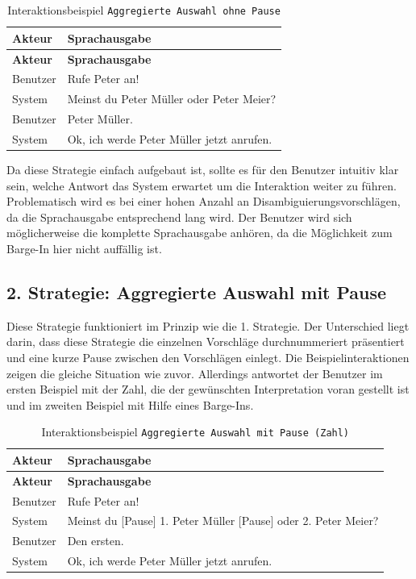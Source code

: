 \documentclass[12pt,a4paper]{scrartcl}
\begin{document}
\begin{longtable}{p{6cm}p{8cm}}
	\caption[Interaktionsbeispiel \texttt{Aggregierte Auswahl ohne Pause}]{Interaktionsbeispiel \texttt{Aggregierte Auswahl ohne Pause}}\\
	\hline
	\textbf{Akteur} &	\textbf{Sprachausgabe}\\
	\hline
	\endfirsthead
	\hline
	\textbf{Akteur} &	\textbf{Sprachausgabe}\\
	\hline
	\endhead
Benutzer & Rufe Peter an!\\
System & Meinst du Peter Müller oder Peter Meier?\\
Benutzer & Peter Müller.\\
System & Ok, ich werde Peter Müller jetzt anrufen.\\

\hline
\end{longtable}
	

Da diese Strategie einfach aufgebaut ist, sollte es für den Benutzer intuitiv klar sein, welche Antwort das System erwartet um die Interaktion weiter zu führen. Problematisch wird es bei einer hohen Anzahl an Disambiguierungsvorschlägen, da die Sprachausgabe entsprechend lang wird. Der Benutzer wird sich möglicherweise die komplette Sprachausgabe anhören, da die Möglichkeit zum Barge-In hier nicht auffällig ist. 
  

\subsection{2. Strategie: Aggregierte Auswahl mit Pause}
Diese Strategie funktioniert im Prinzip wie die 1. Strategie. Der Unterschied liegt darin, dass diese Strategie die einzelnen Vorschläge durchnummeriert präsentiert und eine kurze Pause zwischen den Vorschlägen einlegt. Die Beispielinteraktionen zeigen die gleiche Situation wie zuvor. Allerdings antwortet der Benutzer im ersten Beispiel mit der Zahl, die der gewünschten Interpretation voran gestellt ist und im zweiten Beispiel mit Hilfe eines Barge-Ins.\\
\newpage
\begin{longtable}{p{6cm}p{8cm}}
	\caption[Interaktionsbeispiel \texttt{Aggregierte Auswahl mit Pause (Zahl)}]{Interaktionsbeispiel \texttt{Aggregierte Auswahl mit Pause (Zahl)}}\\
	\hline
	\textbf{Akteur} &	\textbf{Sprachausgabe}\\
	\hline
	\endfirsthead
	\hline
	\textbf{Akteur} &	\textbf{Sprachausgabe}\\
	\hline
	\endhead
Benutzer & Rufe Peter an!\\
System & Meinst du [Pause] 1. Peter Müller [Pause] oder 2. Peter Meier?\\
Benutzer & Den ersten.\\
System & Ok, ich werde Peter Müller jetzt anrufen.\\

\hline
\end{longtable}
\end{document}
